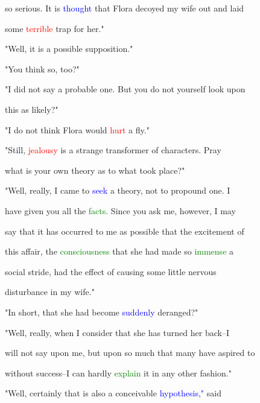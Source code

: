  so serious. It is \textcolor{blue}{thought} that Flora decoyed my wife out and laid

 some \textcolor{red}{terrible} trap for her."



 "Well, it is a possible supposition."



 "You think so, too?"



 "I did not say a probable one. But you do not yourself look upon

 this as likely?"



 "I do not think Flora would \textcolor{red}{hurt} a fly."



 "Still, \textcolor{red}{jealousy} is a strange transformer of characters. \textcolor{BurntOrange}{Pray}

 what is your own \textcolor{BurntOrange}{theory} as to what took place?"



 "Well, really, I came to \textcolor{blue}{seek} a \textcolor{BurntOrange}{theory,} not to propound one. I

 have given you all the \textcolor{green}{facts.} Since you ask me, however, I may

 say that it has occurred to me as possible that the \textcolor{BurntOrange}{excitement} of

 this affair, the \textcolor{green}{consciousness} that she had made so \textcolor{green}{immense} a

 social stride, had the effect of causing some little \textcolor{BurntOrange}{nervous}

 \textcolor{BurntOrange}{disturbance} in my wife."



 "In short, that she had become \textcolor{blue}{suddenly} deranged?"



 "Well, really, when I consider that she has turned her back--I

 will not say upon me, but upon so much that many have \textcolor{BurntOrange}{aspired} to

 without success--I can hardly \textcolor{green}{explain} it in any other fashion."



 "Well, certainly that is also a conceivable \textcolor{blue}{hypothesis,"} said

